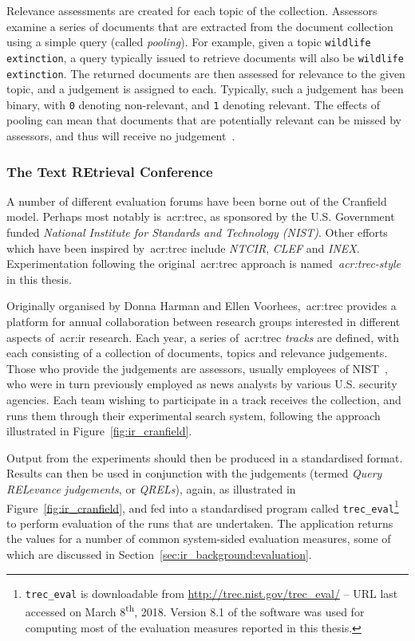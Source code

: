 Relevance assessments are created for each topic of the collection. Assessors examine a series of documents that are extracted from the document collection using a simple query (called \emph{pooling}). For example, given a topic \texttt{wildlife extinction}, a query typically issued to retrieve documents will also be \texttt{wildlife extinction}. The returned documents are then assessed for relevance to the given topic, and a judgement is assigned to each. Typically, such a judgement has been binary, with \texttt{0} denoting non-relevant, and \texttt{1} denoting relevant. The effects of pooling can mean that documents that are potentially relevant can be missed by assessors, and thus will receive no judgement~\citep{keenan2001effect}.

\subsubsection{The Text REtrieval Conference}\label{sec:ir_background:basics:cranfield:trec}
A number of different evaluation forums have been borne out of the Cranfield model. Perhaps most notably is~\gls{acr:trec}, as sponsored by the U.S. Government funded \emph{National Institute for Standards and Technology (NIST)}. Other efforts which have been inspired by~\gls{acr:trec} include \emph{NTCIR}, \emph{CLEF} and \emph{INEX}. Experimentation following the original~\gls{acr:trec} approach is named\emph{~\gls{acr:trec}-style} in this thesis.

Originally organised by Donna Harman and Ellen Voorhees,~\gls{acr:trec} provides a platform for annual collaboration between research groups interested in different aspects of~\gls{acr:ir} research. Each year, a series of~\gls{acr:trec} \emph{tracks} are defined, with each consisting of a collection of documents, topics and relevance judgements. Those who provide the judgements are assessors, usually employees of NIST~\citep{robertson2008history_ir_evaluation}, who were in turn previously employed as news analysts by various U.S. security agencies. Each team wishing to participate in a track receives the collection, and runs them through their experimental search system, following the approach illustrated in Figure~\ref{fig:ir_cranfield}.

Output from the experiments should then be produced in a standardised format. Results can then be used in conjunction with the judgements (termed \emph{Query RELevance judgements}, or \emph{QRELs}), again, as illustrated in Figure~\ref{fig:ir_cranfield}, and fed into a standardised program called \texttt{trec\_eval}\footnote{\texttt{trec\_eval} is downloadable from \url{http://trec.nist.gov/trec_eval/} -- URL last accessed on March 8\textsuperscript{th}, 2018. Version 8.1 of the software was used for computing most of the evaluation measures reported in this thesis.} to perform evaluation of the runs that are undertaken. The application returns the values for a number of common system-sided evaluation measures, some of which are discussed in Section~\ref{sec:ir_background:evaluation}. 

